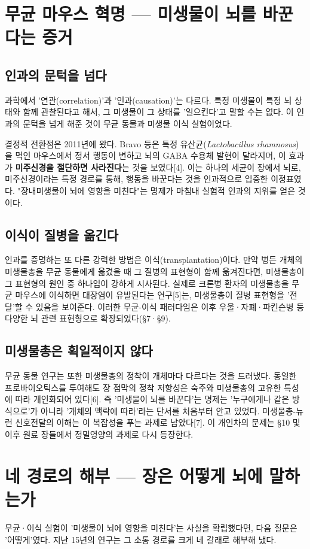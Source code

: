 \documentclass[11pt,oneside]{book}
\begin{document}
\section{무균 마우스 혁명 — 미생물이 뇌를 바꾼다는 증거}
\subsection{인과의 문턱을 넘다}
과학에서 '연관(correlation)'과 '인과(causation)'는 다르다. 특정 미생물이 특정 뇌 상태와 함께 관찰된다고 해서, 그 미생물이 그 상태를 '일으킨다'고 말할 수는 없다. 이 인과의 문턱을 넘게 해준 것이 무균 동물과 미생물 이식 실험이었다.

결정적 전환점은 2011년에 왔다. Bravo 등은 특정 유산균(\textit{Lactobacillus rhamnosus})을 먹인 마우스에서 정서 행동이 변하고 뇌의 GABA 수용체 발현이 달라지며, 이 효과가 \textbf{미주신경을 절단하면 사라진다}는 것을 보였다[4]. 이는 하나의 세균이 장에서 뇌로, 미주신경이라는 특정 경로를 통해, 행동을 바꾼다는 것을 인과적으로 입증한 이정표였다. "장내미생물이 뇌에 영향을 미친다"는 명제가 마침내 실험적 인과의 지위를 얻은 것이다.

\subsection{이식이 질병을 옮긴다}
인과를 증명하는 또 다른 강력한 방법은 이식(transplantation)이다. 만약 병든 개체의 미생물총을 무균 동물에게 옮겼을 때 그 질병의 표현형이 함께 옮겨진다면, 미생물총이 그 표현형의 원인 중 하나임이 강하게 시사된다. 실제로 크론병 환자의 미생물총을 무균 마우스에 이식하면 대장염이 유발된다는 연구[5]는, 미생물총이 질병 표현형을 '전달'할 수 있음을 보여준다. 이러한 무균-이식 패러다임은 이후 우울·자폐·파킨슨병 등 다양한 뇌 관련 표현형으로 확장되었다(§7·§9).

\subsection{미생물총은 획일적이지 않다}
무균 동물 연구는 또한 미생물총의 정착이 개체마다 다르다는 것을 드러냈다. 동일한 프로바이오틱스를 투여해도 장 점막의 정착 저항성은 숙주와 미생물총의 고유한 특성에 따라 개인화되어 있다[6]. 즉 '미생물이 뇌를 바꾼다'는 명제는 '누구에게나 같은 방식으로'가 아니라 '개체의 맥락에 따라'라는 단서를 처음부터 안고 있었다. 미생물총-뉴런 신호전달의 이해는 이 복잡성을 푸는 과제로 남았다[7]. 이 개인차의 문제는 §10 및 이후 원료 장들에서 정밀영양의 과제로 다시 등장한다.

\section{네 경로의 해부 — 장은 어떻게 뇌에 말하는가}
무균·이식 실험이 '미생물이 뇌에 영향을 미친다'는 사실을 확립했다면, 다음 질문은 '어떻게'였다. 지난 15년의 연구는 그 소통 경로를 크게 네 갈래로 해부해 냈다.
\end{document}
